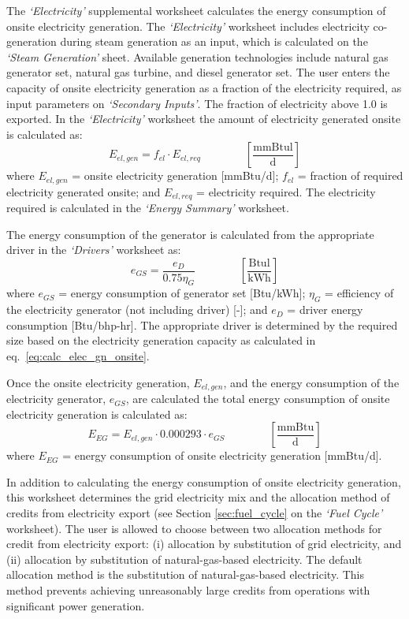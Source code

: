 \documentclass[11pt]{report}
\newcommand{\sheet}[1]{\textit{`{#1}'}}
\newcommand{\eqnunitfrac}[2]{\quad\quad \scriptstyle{\left[\frac{\text{#1}}{\text{#2}}\right]}}
\begin{document}
The \sheet{Electricity} supplemental worksheet calculates the energy consumption of onsite electricity generation. The \sheet{Electricity} worksheet  includes electricity co-generation during steam generation as an input, which is calculated on the \sheet{Steam Generation} sheet. Available generation technologies include natural gas generator set, natural gas turbine, and diesel generator set. The user enters the capacity of onsite electricity generation as a fraction of the electricity required, as input parameters on \sheet{Secondary Inputs}. The fraction of electricity above 1.0 is exported. In the \sheet{Electricity} worksheet the amount of electricity generated onsite is calculated as:
\begin{equation} \label{eq:calc_elec_gn_onsite}
E_{el,gen} = f_{el} \cdot E_{el,req}  \quad\quad\eqnunitfrac{mmBtul}{d}
\end{equation}
where $E_{el,gen}$ = onsite electricity generation [mmBtu/d]; $f_{el}$ = fraction of required electricity generated onsite; and $E_{el,req}$ = electricity required. The electricity required is calculated in the \sheet{Energy Summary} worksheet.

The energy consumption of the generator is calculated from the appropriate driver in the \sheet{Drivers} worksheet as:
\begin{equation}
e_{GS} = \frac{e_{D}}{0.75 \eta_{G} } \quad\quad\eqnunitfrac{Btul}{kWh}
\end{equation}
where $e_{GS}$ = energy consumption of generator set [Btu/kWh]; $\eta_{G}$ = efficiency of the electricity generator (not including driver) [-]; and $e_{D}$ = driver energy consumption [Btu/bhp-hr]. The appropriate driver is determined by the required size based on the electricity generation capacity as calculated in eq.\ \eqref{eq:calc_elec_gn_onsite}.


Once the onsite electricity generation, $E_{el,gen}$, and the energy consumption of the electricity generator, $e_{GS}$, are calculated the total energy consumption of onsite electricity generation is calculated as:
\begin{equation}
E_{EG} = E_{el,gen} \cdot 0.000293 \cdot e_{GS} \quad\quad\eqnunitfrac{mmBtu}{d}
\end{equation}
where $E_{EG}$ = energy consumption of onsite electricity generation [mmBtu/d].

In addition to calculating the energy consumption of onsite electricity generation, this worksheet determines the grid electricity mix and the allocation method of credits from electricity export (see Section \ref{sec:fuel_cycle} on the \sheet{Fuel Cycle} worksheet). The user is allowed to choose between two allocation methods for credit from electricity export: (i) allocation by substitution of grid electricity, and (ii) allocation by substitution of natural-gas-based electricity. The default allocation method is the substitution of natural-gas-based electricity. This method prevents achieving unreasonably large credits from operations with significant power generation. 
\end{document}
